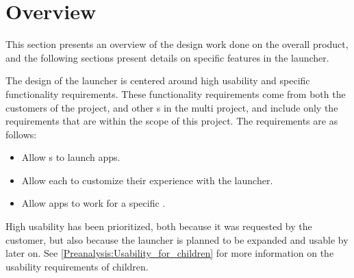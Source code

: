 \section{Overview}
\label{sec:design_overview}
This section presents an overview of the design work done on the overall product, and the following sections present details on specific features in the launcher. \newline

The design of the \giraf[] launcher is centered around high usability and specific functionality requirements. 
These functionality requirements come from both the customers of the project, and other \localgroup[]s in the multi project, and include only the requirements that are within the scope of this project. \newline
The requirements are as follows:
\begin{itemize}
\item Allow \guardian[]s to launch apps.
\item Allow each \guardian[] to customize their experience with the launcher. 
\item Allow apps to work for a specific \autist[].
\end{itemize}

High usability has been prioritized, both because it was requested by the customer, but also because the launcher is planned to be expanded and usable by \autists[] later on.
See \autoref{Preanalysis:Usability_for_children} for more information on the usability requirements of children. \newline

